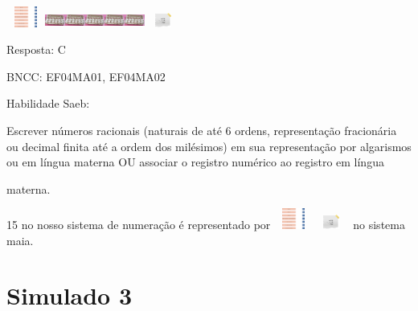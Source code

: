 \begin{enumerate}
  \includegraphics[width=0.50004in,height=0.26669in]{media/image14.png}\includegraphics[width=0.25836in,height=0.18335in]{media/image15.png}\includegraphics[width=0.25836in,height=0.18335in]{media/image15.png}\includegraphics[width=0.25836in,height=0.18335in]{media/image15.png}\includegraphics[width=0.25836in,height=0.18335in]{media/image15.png}\includegraphics[width=0.25836in,height=0.18335in]{media/image15.png}\includegraphics[width=0.47504in,height=0.18335in]{media/image16.png}
\end{enumerate}

Resposta: C

BNCC: EF04MA01, EF04MA02

Habilidade Saeb:

Escrever números racionais (naturais de até 6 ordens, representação
fracionária ou decimal finita até a ordem dos milésimos) em sua
representação por algarismos ou em língua materna OU associar o registro
numérico ao registro em língua

materna.

15 no nosso sistema de numeração é representado por
\includegraphics[width=0.50004in,height=0.26669in]{media/image14.png}\includegraphics[width=0.47504in,height=0.18335in]{media/image16.png}
no sistema maia.

\section{Simulado 3}\label{simulado-3}

